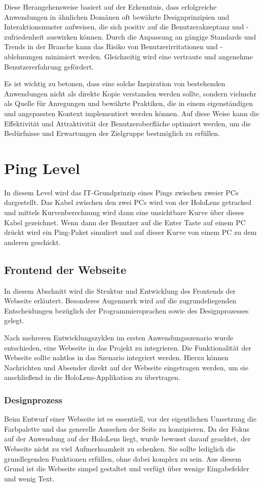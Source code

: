 Diese Herangehensweise basiert auf der Erkenntnis, dass erfolgreiche Anwendungen in ähnlichen Domänen oft bewährte
Designprinzipien und Interaktionsmuster aufweisen, die sich positiv auf die Benutzerakzeptanz und -zufriedenheit auswirken
können. Durch die Anpassung an gängige Standards und Trends in der Branche kann das Risiko von Benutzerirritationen
und -ablehnungen minimiert werden. Gleichzeitig wird eine vertraute und angenehme Benutzererfahrung gefördert.

Es ist wichtig zu betonen, dass eine solche Inspiration von bestehenden Anwendungen nicht als direkte Kopie verstanden
werden sollte, sondern vielmehr als Quelle für Anregungen und bewährte Praktiken, die in einem eigenständigen und angepassten
Kontext implementiert werden können. Auf diese Weise kann die Effektivität und Attraktivität der Benutzeroberfläche
optimiert werden, um die Bedürfnisse und Erwartungen der Zielgruppe bestmöglich zu erfüllen.

\section{Ping Level}
In diesem Level wird das IT-Grundprinzip eines Pings zwischen zweier
PCs dargestellt. Das Kabel zwischen den zwei PCs wird von der
HoloLens getracked und mittels Kurvenberechnung wird dann eine
unsichtbare Kurve über dieses Kabel gezeichnet. Wenn dann der Benutzer
auf die Enter Taste auf einem PC drückt wird ein Ping-Paket simuliert
und auf dieser Kurve von einem PC zu dem anderen geschickt.

\subsection{Frontend der Webseite}
In diesem Abschnitt wird die Struktur und Entwicklung des Frontends der Webseite erläutert. Besonderes Augenmerk wird
auf die zugrundeliegenden Entscheidungen bezüglich der Programmiersprachen sowie des Designprozesses gelegt.

Nach mehreren Entwicklungszyklen im ersten Anwendungsszenario wurde entschieden, eine Webseite in das Projekt zu
integrieren. Die Funktionalität der Webseite sollte nahtlos in das Szenario integriert werden. Hierzu können Nachrichten
und Absender direkt auf der Webseite eingetragen werden, um sie anschließend in die HoloLens-Applikation zu übertragen.

\subsubsection{Designprozess}
Beim Entwurf einer Webseite ist es essentiell, vor der eigentlichen Umsetzung die Farbpalette und das generelle Aussehen
der Seite zu konzipieren. Da der Fokus auf der Anwendung auf der HoloLens liegt, wurde bewusst darauf geachtet, der
Webseite nicht zu viel Aufmerksamkeit zu schenken. Sie sollte lediglich die grundlegenden Funktionen erfüllen, ohne dabei
komplex zu sein. Aus diesem Grund ist die Webseite simpel gestaltet und verfügt über wenige Eingabefelder und wenig Text.

